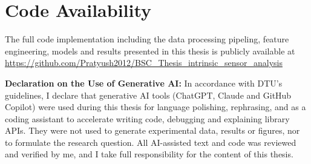 \section*{Code Availability}

The full code implementation including the data processing pipeling, feature engineering, models and results presented in this thesis is publicly available at \url{https://github.com/Pratyush2012/BSC_Thesis_intrinsic_sensor_analysis}



\textbf{Declaration on the Use of Generative AI:}
In accordance with DTU's guidelines, I declare that generative AI tools (ChatGPT, Claude and GitHub Copilot) were used during this thesis for language polishing, rephrasing, and as a coding assistant to accelerate writing code, debugging and explaining library APIs. They were not used to generate experimental data, results or figures, nor to formulate the research question. All AI-assisted text and code was reviewed and verified by me, and I take full responsibility for the content of this thesis.